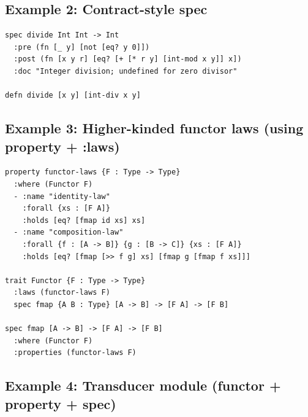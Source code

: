 \documentclass[11pt]{article}
\begin{document}
\subsection{Example 2: Contract-style spec}
\label{sec:orgd624775}

\begin{verbatim}
spec divide Int Int -> Int
  :pre (fn [_ y] [not [eq? y 0]])
  :post (fn [x y r] [eq? [+ [* r y] [int-mod x y]] x])
  :doc "Integer division; undefined for zero divisor"

defn divide [x y] [int-div x y]
\end{verbatim}
\subsection{Example 3: Higher-kinded functor laws (using property + :laws)}
\label{sec:org4402f63}

\begin{verbatim}
property functor-laws {F : Type -> Type}
  :where (Functor F)
  - :name "identity-law"
    :forall {xs : [F A]}
    :holds [eq? [fmap id xs] xs]
  - :name "composition-law"
    :forall {f : [A -> B]} {g : [B -> C]} {xs : [F A]}
    :holds [eq? [fmap [>> f g] xs] [fmap g [fmap f xs]]]

trait Functor {F : Type -> Type}
  :laws (functor-laws F)
  spec fmap {A B : Type} [A -> B] -> [F A] -> [F B]

spec fmap [A -> B] -> [F A] -> [F B]
  :where (Functor F)
  :properties (functor-laws F)
\end{verbatim}
\subsection{Example 4: Transducer module (functor + property + spec)}
\label{sec:orge98cc3f}
\end{document}

